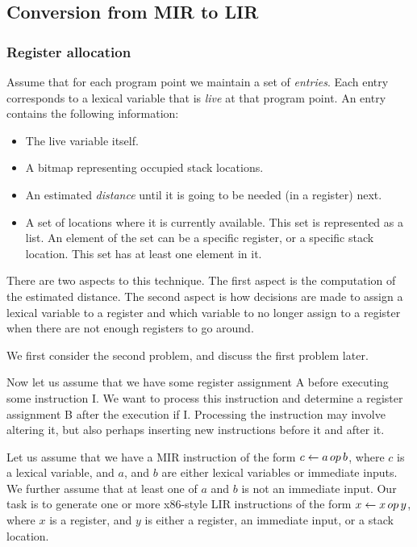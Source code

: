 \subsection{Conversion from MIR to LIR}

\subsubsection{Register allocation}

Assume that for each program point we maintain a set of
\emph{entries}.  Each entry corresponds to a lexical variable that is
\emph{live} at that program point.  An entry contains the following
information:

\begin{itemize}
\item The live variable itself.
\item A bitmap representing occupied stack locations.
\item An estimated \emph{distance} until it is going to be needed (in
  a register) next.
\item A set of locations where it is currently available.  This set is
  represented as a list.  An element of the set can be a specific
  register, or a specific stack location.  This set has at least one
  element in it.
\end{itemize}

There are two aspects to this technique.  The first aspect is the
computation of the estimated distance.  The second aspect is how
decisions are made to assign a lexical variable to a register and
which variable to no longer assign to a register when there are not
enough registers to go around.

We first consider the second problem, and discuss the first problem later.

Now let us assume that we have some register assignment A before
executing some instruction I.  We want to process this instruction and
determine a register assignment B after the execution if I.
Processing the instruction may involve altering it, but also perhaps
inserting new instructions before it and after it.

Let us assume that we have a MIR instruction of the form $c \leftarrow
a\thinspace op\thinspace b$, where $c$ is a lexical variable, and $a$,
and $b$ are either lexical variables or immediate inputs.  We further
assume that at least one of $a$ and $b$ is not an immediate input.
Our task is to generate one or more x86-style LIR instructions of the
form $x \leftarrow x\thinspace op\thinspace y$, where $x$ is a
register, and $y$ is either a register, an immediate input, or a stack
location.

